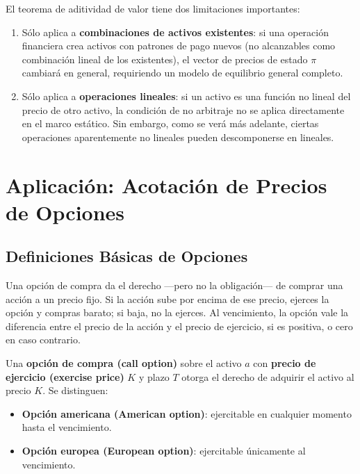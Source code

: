 \documentclass[12pt]{article}
\begin{document}
El teorema de aditividad de valor tiene dos limitaciones importantes:

\begin{enumerate}
  \item S\'olo aplica a \textbf{combinaciones de activos existentes}: si una operaci\'on financiera crea activos con patrones de pago nuevos (no alcanzables como combinaci\'on lineal de los existentes), el vector de precios de estado $\pi$ cambiar\'a en general, requiriendo un modelo de equilibrio general completo.
  \item S\'olo aplica a \textbf{operaciones lineales}: si un activo es una funci\'on no lineal del precio de otro activo, la condici\'on de no arbitraje no se aplica directamente en el marco est\'atico. Sin embargo, como se ver\'a m\'as adelante, ciertas operaciones aparentemente no lineales pueden descomponerse en lineales.
\end{enumerate}

\section{Aplicaci\'on: Acotaci\'on de Precios de Opciones}

\subsection{Definiciones B\'asicas de Opciones}

\begin{intuicion}
Una opci\'on de compra da el derecho ---pero no la obligaci\'on--- de comprar una acci\'on a un precio fijo. Si la acci\'on sube por encima de ese precio, ejerces la opci\'on y compras barato; si baja, no la ejerces. Al vencimiento, la opci\'on vale la diferencia entre el precio de la acci\'on y el precio de ejercicio, si es positiva, o cero en caso contrario.
\end{intuicion}

Una \textbf{opci\'on de compra (call option)} sobre el activo $a$ con \textbf{precio de ejercicio (exercise price)} $K$ y plazo $T$ otorga el derecho de adquirir el activo al precio $K$. Se distinguen:

\begin{itemize}
  \item \textbf{Opci\'on americana (American option)}: ejercitable en cualquier momento hasta el vencimiento.
  \item \textbf{Opci\'on europea (European option)}: ejercitable \'unicamente al vencimiento.
\end{itemize}
\end{document}

